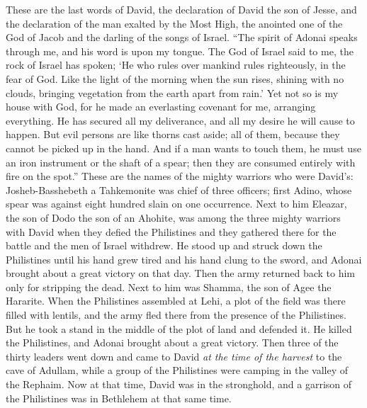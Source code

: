 \begin{biblechapter} %
 These are the last words of David, the declaration of David the son of Jesse, and the declaration of the man exalted by the Most High, the anointed one of the God of Jacob and the darling of the songs of Israel.
\verse “The spirit of Adonai speaks through me, and his word is upon my tongue.
\verse The God of Israel said to me, the rock of Israel has spoken; ‘He who rules over mankind rules righteously, in the fear of God.
\verse Like the light of the morning when the sun rises, shining with no clouds, bringing vegetation from the earth apart from rain.’
\verse Yet not so is my house with God, for he made an everlasting covenant for me, arranging everything. He has secured all my deliverance, and all my desire he will cause to happen.
\verse But evil persons are like thorns cast aside; all of them, because they cannot be picked up in the hand.
\verse And if a man wants to touch them, he must use an iron instrument or the shaft of a spear; then they are consumed entirely with fire on the spot.”
 These are the names of the mighty warriors who were David’s: Josheb-Basshebeth a Tahkemonite was chief of three officers; first Adino, whose spear was against eight hundred slain on one occurrence.
\verse Next to him Eleazar, the son of Dodo the son of an Ahohite, was among the three mighty warriors with David when they defied the Philistines and they gathered there for the battle and the men of Israel withdrew.
\verse He stood up and struck down the Philistines until his hand grew tired and his hand clung to the sword, and Adonai brought about a great victory on that day. Then the army returned back to him only for stripping the dead.
\verse Next to him was Shamma, the son of Agee the Hararite. When the Philistines assembled at Lehi, a plot of the field was there filled with lentils, and the army fled there from the presence of the Philistines.
\verse But he took a stand in the middle of the plot of land and defended it. He killed the Philistines, and Adonai brought about a great victory.
\verse Then three of the thirty leaders went down and came to David \textit{at the time of the harvest} to the cave of Adullam, while a group of the Philistines were camping in the valley of the Rephaim.
\verse Now at that time, David was in the stronghold, and a garrison of the Philistines was in Bethlehem at that same time.

\end{biblechapter}
